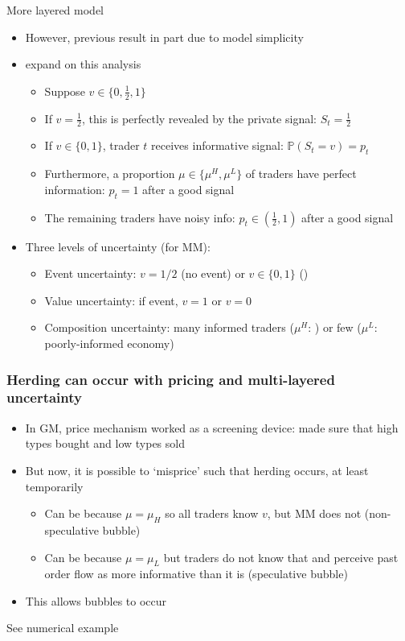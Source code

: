 \documentclass[english,10pt
,aspectratio=169
]{beamer}
\begin{document}
\begin{frame}{More layered model}
	\begin{itemize}
		\item However, previous result in part due to model simplicity
		\item \cite{avery_multidimensional_1998} expand on this analysis
		\begin{itemize}
			\item Suppose $v \in \{0,\frac{1}{2},1\}$
			\item If $v=\frac{1}{2}$, this is perfectly revealed by the private signal: $S_{t}=\frac{1}{2}$
			\item If $v \in \{0,1\}$, trader $t$ receives informative signal: $\mathbb{P}(S_{t}=v)=p_{t}$
			\item Furthermore, a proportion $\mu \in \{\mu^{H}, \mu^{L}\}$ of traders have perfect information: $p_{t}=1$ after a good signal
			\item The remaining traders have noisy info: $p_{t} \in (\frac{1}{2},1)$ after a good signal
		\end{itemize}
		\pause
		\item Three levels of uncertainty (for MM): 
		\begin{itemize}
			\item Event uncertainty: $v=1/2$ (\alert{no event}) or $v \in \{0,1\}$ ()
			\item Value uncertainty: if event, $v=1$ or $v=0$
			\item Composition uncertainty: many informed traders ($\mu^{H}$: ) or few ($\mu^{L}$: \alert{poorly-informed economy})
		\end{itemize}
	\end{itemize}
\end{frame}


\begin{frame}[label=az]
	\frametitle{Herding can occur with pricing and multi-layered uncertainty}
	\begin{itemize}
		\item In GM, price mechanism worked as a screening device: made sure that high types bought and low types sold
		\item But now, it is possible to `misprice' such that herding occurs, at least temporarily
		\begin{itemize}
			\item Can be because $\mu = \mu_H$ so all traders know $v$, but MM does not (non-speculative bubble)
			\item Can be because $\mu = \mu_L$ but traders do not know that and perceive past order flow as more informative than it is (speculative bubble)
		\end{itemize}
		\item This allows bubbles to occur
	\end{itemize}
	See numerical example \hyperlink{layers}{}
\end{frame}
\end{document}
